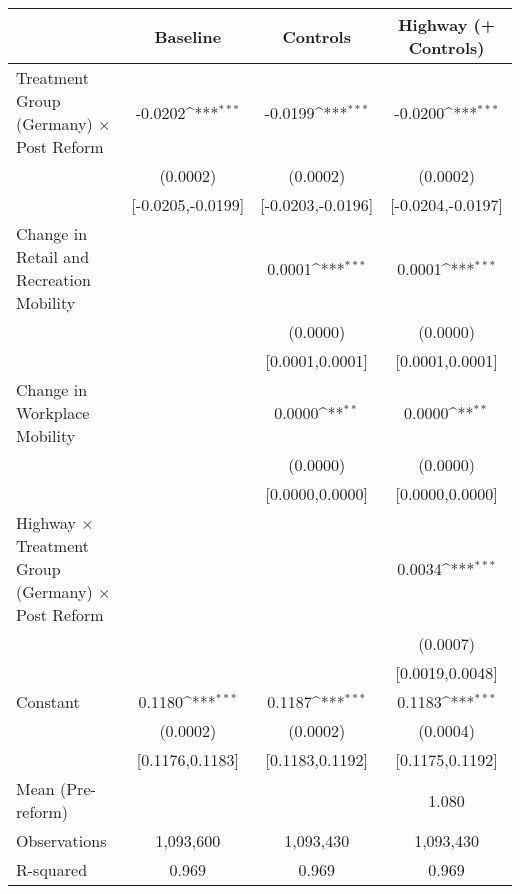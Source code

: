 {
\def\sym#1{\ifmmode^{#1}\else\(^{#1}\)\fi}
\begin{tabular}{l*{3}{c}}
\toprule
                    &\multicolumn{1}{c}{Baseline}&\multicolumn{1}{c}{Controls}&\multicolumn{1}{c}{Highway (+ Controls)}\\
\midrule
Treatment Group (Germany) $\times$ Post Reform&     -0.0202\sym{***}&     -0.0199\sym{***}&     -0.0200\sym{***}\\
                    &    (0.0002)         &    (0.0002)         &    (0.0002)         \\
                    &[-0.0205,-0.0199]         &[-0.0203,-0.0196]         &[-0.0204,-0.0197]         \\
Change in Retail and Recreation Mobility&                     &      0.0001\sym{***}&      0.0001\sym{***}\\
                    &                     &    (0.0000)         &    (0.0000)         \\
                    &                     &[0.0001,0.0001]         &[0.0001,0.0001]         \\
Change in Workplace Mobility&                     &      0.0000\sym{**} &      0.0000\sym{**} \\
                    &                     &    (0.0000)         &    (0.0000)         \\
                    &                     &[0.0000,0.0000]         &[0.0000,0.0000]         \\
Highway $\times$ Treatment Group (Germany) $\times$ Post Reform&                     &                     &      0.0034\sym{***}\\
                    &                     &                     &    (0.0007)         \\
                    &                     &                     &[0.0019,0.0048]         \\
Constant            &      0.1180\sym{***}&      0.1187\sym{***}&      0.1183\sym{***}\\
                    &    (0.0002)         &    (0.0002)         &    (0.0004)         \\
                    &[0.1176,0.1183]         &[0.1183,0.1192]         &[0.1175,0.1192]         \\
\midrule
Mean (Pre-reform)   &                     &                     &       1.080         \\
Observations        &   1,093,600         &   1,093,430         &   1,093,430         \\
R-squared           &       0.969         &       0.969         &       0.969         \\
\bottomrule
\end{tabular}
}
